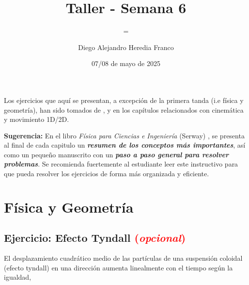 \documentclass{replab}
\title{Taller - Semana 6}
\author{Diego Alejandro Heredia Franco}
\date{07/08 de mayo de 2025}
\subtitle={Física - Cinemática 1D/2D}
\begin{document}
\setlength{\parindent}{0pt}
	
	\pagestyle{fancy}
	\unspacedoperators
	
	{\begin{tcolorbox}[colframe=white, colback=principaldos, arc=8pt]
		\begin{center}
			\maketitle

		\end{center}
	\end{tcolorbox}}

	Los ejercicios que aquí se presentan, a excepción de la primera tanda (i.e física y geometría), han sido tomados de \cite{lanaturaleza}, \cite{serway} y \cite{londono} en los capítulos relacionados con cinemática y movimiento 1D/2D.\\

{\begin{tcolorbox}[colframe=red!50!black, colback=red!5!white, arc=8pt]
	\textbf{Sugerencia:} En el libro \textit{Física para Ciencias e Ingeniería} (Serway) \cite{serway}, se presenta al final de cada capitulo un \textit{\textbf{resumen de los conceptos más importantes}}, así como un pequeño manuscrito con un \textit{\textbf{paso a paso general para resolver problemas}}. Se recomienda fuertemente al estudiante leer este instructivo para que pueda resolver los ejercicios de forma más organizada y eficiente.
\end{tcolorbox}}

	\section{Física y Geometría}

	\subsection{Ejercicio: Efecto Tyndall \textcolor{red}{(\textit{opcional})}}

	El desplazamiento cuadrático medio de las partículas de una suspensión coloidal (efecto tyndall) en una dirección aumenta linealmente con el tiempo según la igualdad,
\end{document}
